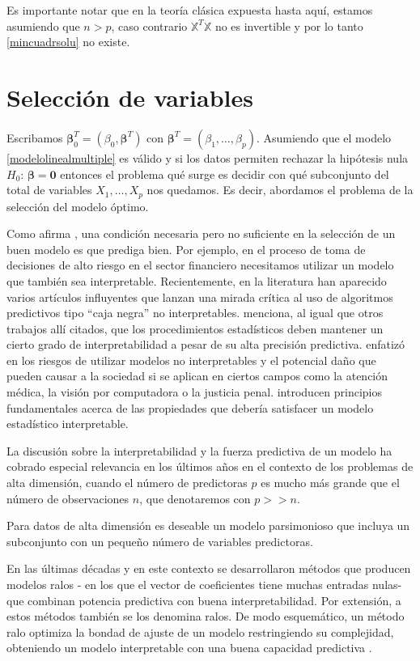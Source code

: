 \documentclass{report}
\begin{document}
 Es importante notar que en la teoría clásica expuesta hasta aquí, estamos asumiendo que $n>p$, caso contrario $\mathbb{X}^T\mathbb{X}$ no es invertible y por lo tanto  \eqref{mincuadrsolu} no existe.


\section{Selección de variables}
 Escribamos $\boldsymbol{\beta}_0^T=(\beta_0,\boldsymbol{\beta}^T)$ con $\boldsymbol{\beta}^T=(\beta_1,\ldots, \beta_p)$.  Asumiendo que el modelo \eqref{modelolinealmultiple} es válido y si los datos permiten rechazar la hipótesis nula $H_0$: $\boldsymbol{\beta}=\boldsymbol{0}$
entonces el problema qué surge es decidir con qué subconjunto del total de variables $X_1,\ldots, X_p$ nos quedamos.  Es decir, abordamos el problema de la selección del modelo óptimo. 


 Como afirma \cite{christidisthesis}, una condición necesaria pero no suficiente en la  selección de un buen modelo es que prediga bien. Por ejemplo, en el proceso de toma de decisiones de alto riesgo en el sector financiero  necesitamos utilizar un modelo que también sea interpretable. Recientemente, en la literatura han aparecido varios artículos influyentes que lanzan una mirada crítica al uso de algoritmos predictivos tipo ``caja negra'' no interpretables. \cite{christidisthesis} menciona, al igual que otros trabajos allí citados, que los procedimientos estadísticos deben mantener un cierto grado de interpretabilidad a pesar de su alta precisión predictiva.  \cite{rudin2019} enfatizó en los riesgos de utilizar modelos no interpretables y el potencial daño que pueden causar a la sociedad si se aplican en ciertos campos como la atención médica, la visión por computadora o la justicia penal.  \cite{rudin2019} introducen principios fundamentales acerca de las propiedades que debería satisfacer un modelo estadístico interpretable.


 La discusión sobre la interpretabilidad y la fuerza predictiva de un modelo ha cobrado especial relevancia en los últimos años en el contexto de los problemas de alta dimensión, cuando el número de predictoras $p$ es mucho más grande que el número de observaciones $n$,  que denotaremos con $p>>n$. 


 Para datos de alta dimensión es deseable un modelo parsimonioso que incluya un subconjunto con un pequeño número de variables predictoras. 


 En las últimas  décadas y en este contexto se desarrollaron métodos que producen modelos ralos - en los que el vector de coeficientes tiene muchas entradas nulas- que combinan potencia predictiva con buena interpretabilidad. Por extensión, a estos métodos también se los denomina ralos. De modo esquemático, un método ralo optimiza la bondad de ajuste de un modelo restringiendo su complejidad, obteniendo un modelo interpretable con una buena capacidad predictiva  \citep{rudin2019}.
\end{document}
